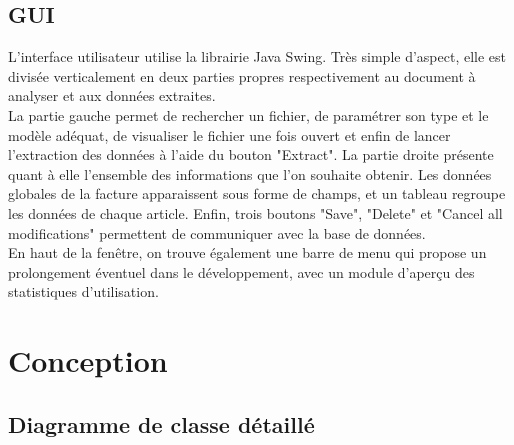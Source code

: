 \subsection{GUI}
L'interface utilisateur utilise la librairie Java Swing. Très simple d'aspect, elle est divisée verticalement en deux parties propres respectivement au document à analyser et aux données extraites.\\

La partie gauche permet de rechercher un fichier, de paramétrer son type et le modèle adéquat, de visualiser le fichier une fois ouvert et enfin de lancer l'extraction des données à l'aide du bouton "Extract".
La partie droite présente quant à elle l'ensemble des informations que l'on souhaite obtenir. Les données globales de la facture apparaissent sous forme de champs, et un tableau regroupe les données de chaque article.
Enfin, trois boutons "Save", "Delete" et "Cancel all modifications" permettent de communiquer avec la base de données.\\

En haut de la fenêtre, on trouve également une barre de menu qui propose un prolongement éventuel dans le développement, avec un module d'aperçu des statistiques d'utilisation.

\section{Conception}

\subsection{Diagramme de classe détaillé}

